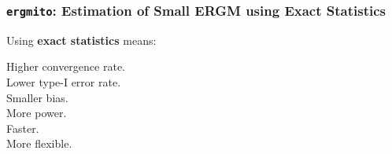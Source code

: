\documentclass[aspectratio=169, 9pt]{beamer}
\begin{document}
% 
% 
% 

\begin{frame}[c,label=ergmito-checklist]
\frametitle{\texttt{ergmito}: Estimation of Small ERGM using Exact Statistics}

\begin{minipage}[m]{.28\linewidth}
	
	\small Using \textbf{exact statistics} means:\normalsize
	
	 Higher convergence rate.\\
	 Lower type-I error rate.\\
	 Smaller bias.\\
	 More power.\\
	 Faster.\\
	 More flexible.
	

\end{minipage}
\end{frame}
\end{document}
